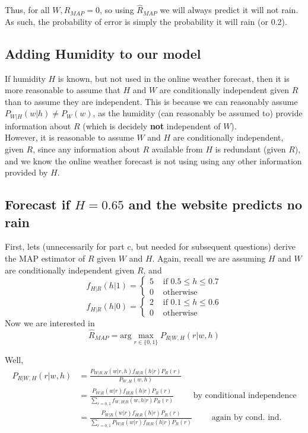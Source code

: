 \documentclass[paper=a4, fontsize=11pt]{scrartcl} %
\numberwithin{equation}{section} %
\numberwithin{figure}{section} %
\numberwithin{table}{section} %
\begin{document}
Thus, for all $W, \hat{R}_{MAP} = 0$, so using $\hat{R}_{MAP}$ we will always predict it will not rain. As such, the probability of error is simply the probability it will rain (or 0.2).

\subsection{Adding Humidity to our model}

If humidity $H$ is known, but not used in the online weather forecast, then it is more reasonable to assume that $H$ and $W$ are conditionally independent given $R$ than to assume they are independent. This is because we can reasonably assume $P_{W | H}(w | h) \ne P_W(w)$, as the humidity (can reasonably be assumed to) provide information about $R$ (which is decidely \textbf{not} independent of $W$). \\

However, it is reasonable to assume $W$ and $H$ are conditionally independent, given $R$, since any information about $R$ available from $H$ is redundant (given $R$), and we know the online weather forecast is not using using any other information provided by $H$.

\subsection{Forecast if $H = 0.65$ and the website predicts no rain}

First, lets (unnecessarily for part c, but needed for subsequent questions) derive the MAP estimator of $R$ given $W$ and $H$. Again, recall we are assuming $H$ and $W$ are conditionally independent given $R$, and
\[
f_{H | R} (h | 1) =
\begin{cases}
   5 & \textrm{ if } 0.5 \leq h \leq 0.7 \\
   0 & \textrm{ otherwise}
\end{cases}
\] 
\[
f_{H | R} (h | 0) =
\begin{cases}
   2 & \textrm{ if } 0.1 \leq h \leq 0.6 \\
   0 & \textrm{ otherwise}
\end{cases}
\]
Now we are interested in
\[\hat{R}_{MAP} = \textrm{arg} \max_{r \in \{0, 1\}} P_{R | W, H} (r | w, h) \]

Well, 
\begin{align*}
P_{R | W, H}(r | w,h) &= \frac{P_{W | R, H}(w | r, h) f_{H | R}(h | r) P_R(r)}{P_{W,H}(w,h)} \\
   &= \frac{P_{W | R}(w | r) f_{H | R}(h | r) P_R(r)}{\sum_{r = 0,1} f_{W,H | R}(w,h | r) P_R(r)} \qquad{} \textrm{ by conditional independence}\\
   &= \frac{P_{W | R}(w | r) f_{H | R}(h | r) P_R(r)}{\sum_{r = 0,1} P_{W | R}(w | r) f_{H | R}(h | r) P_R(r)}\qquad{} \textrm{ again by cond. ind.}
\end{align*}
\end{document}
